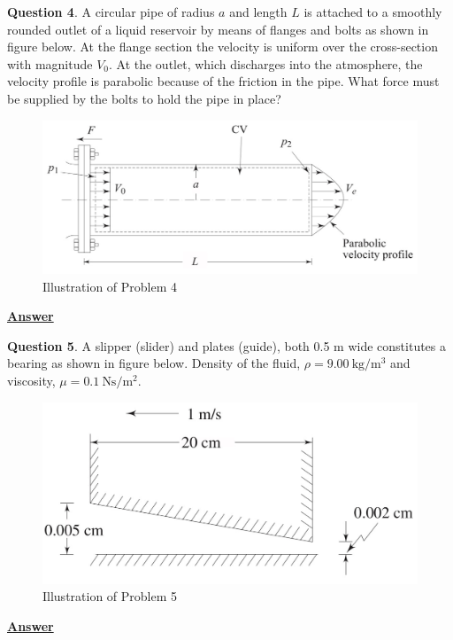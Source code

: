 \documentclass[10pt]{article}
\begin{document}
\break

\textbf{Question 4}. A circular pipe of radius $a$ and length $L$ is attached to a smoothly rounded outlet of a liquid reservoir by means of flanges and bolts as shown in figure below. At the flange section the velocity is uniform over the cross-section with magnitude $V_0$. At the outlet, which discharges into the atmosphere, the velocity profile is parabolic because of the friction in the pipe. What force must be supplied by the bolts to hold the pipe in place?

\begin{figure}[h]
    \centering
    \includegraphics[scale=0.83]{Problem4.jpg}
    \caption{Illustration of Problem 4}
    \label{fig:figprob4}
\end{figure}

\textbf{\underline{Answer}}

\break

\textbf{Question 5}. A slipper (slider) and plates (guide), both 0.5 m wide constitutes a bearing as shown in figure below. Density of the fluid, $\rho = 9.00\ \textrm{kg/}\textrm{m}^3$ and viscosity, $\mu = 0.1\ \textrm{Ns/}\textrm{m}^2$.

\begin{figure}[h]
    \centering
    \includegraphics[scale=0.83]{Problem5.jpg}
    \caption{Illustration of Problem 5}
    \label{fig:figprob5}
\end{figure}

\textbf{\underline{Answer}}
\end{document}
